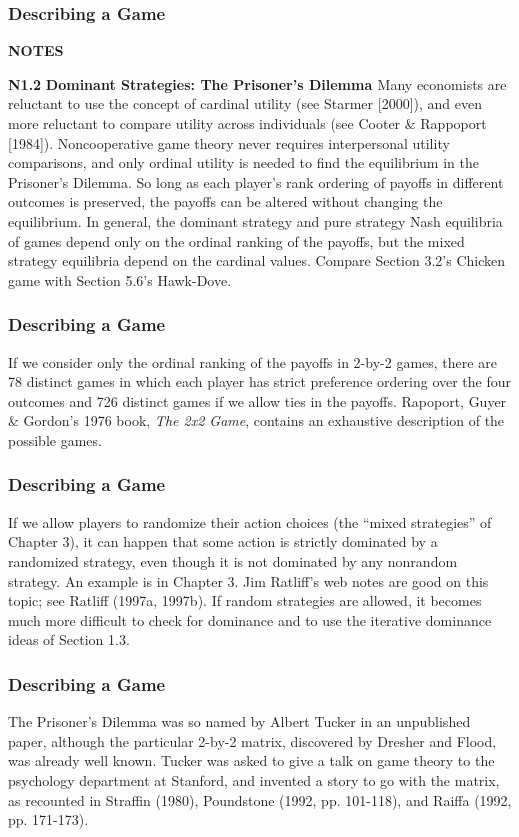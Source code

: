  \begin{frame}[fragile]\frametitle{Describing a Game}

 {\bf  NOTES}

 {\bf N1.2 } {\bf Dominant Strategies: {The   Prisoner's Dilemma  } }
 Many economists are reluctant to use the concept of cardinal utility (see
Starmer [2000]), and even more reluctant to compare utility across individuals
(see Cooter \& Rappoport [1984]).  Noncooperative game theory never requires
interpersonal utility comparisons, and only ordinal utility is needed to find
the equilibrium in  the {Prisoner's Dilemma}. So long as each player's rank
ordering of payoffs in different outcomes is preserved, the payoffs can be
altered without changing the equilibrium.  In general, the dominant strategy and
pure strategy Nash equilibria of games depend only on the ordinal ranking of the
payoffs, but the mixed strategy equilibria depend on the cardinal values.
Compare  Section 3.2's {Chicken} game with  Section 5.6's {Hawk-Dove}.

\end{frame}
 \begin{frame}[fragile]\frametitle{Describing a Game}
 
 If we consider only the ordinal ranking of the payoffs in 2-by-2 games,
there are 78 distinct games in which each player has strict preference ordering
over the four outcomes   and 726 distinct games if we allow ties in the payoffs.
Rapoport,   Guyer \&   Gordon's 1976 book,  {\it The 2x2 Game}, contains an
exhaustive description of the possible games.

\end{frame}
 \begin{frame}[fragile]\frametitle{Describing a Game}
  If we allow players to randomize their action choices (the ``mixed
strategies'' of Chapter 3), it can happen that  some action is strictly
dominated by a randomized strategy, even though it is not dominated by any
nonrandom strategy. An example is in Chapter 3.    Jim Ratliff's   web notes are
good on this topic;  see Ratliff (1997a, 1997b).   If random strategies are
allowed, it becomes much more difficult to check for dominance and to use the
iterative dominance ideas of Section 1.3.

\end{frame}
 \begin{frame}[fragile]\frametitle{Describing a Game}
 
 The  { Prisoner's Dilemma} was so  named by Albert Tucker in an
unpublished paper, although the particular 2-by-2 matrix, discovered by Dresher
and Flood, was already well known.  Tucker was asked to give a talk on game
theory to the psychology department at Stanford, and invented a story to go with
the matrix, as recounted in   Straffin (1980),   Poundstone (1992, pp.
101-118), and  Raiffa (1992, pp. 171-173).

\end{frame}
